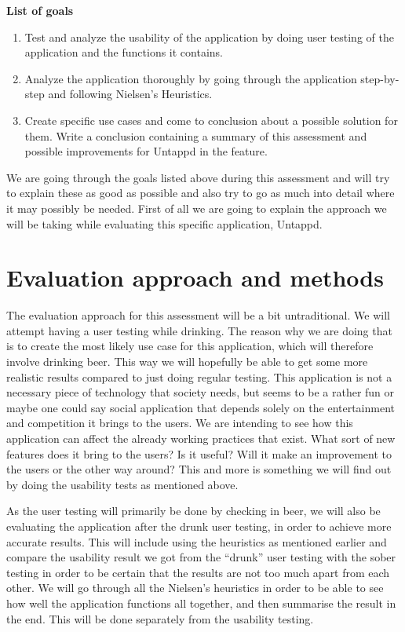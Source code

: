 \documentclass[12pt]{article}
\begin{document}
\textbf{List of goals}
\begin{enumerate}
  \item Test and analyze the usability of the application by doing user testing of the application and the functions it contains.
  \item Analyze the application thoroughly by going through the application step-by-step and following Nielsen’s Heuristics.
  \item Create specific use cases and come to conclusion about a possible solution for them.
  Write a conclusion containing a summary of this assessment and possible improvements for Untappd in the feature.
\end{enumerate}

We are going through the goals listed above during this assessment and will try
to explain these as good as possible and also try to go as much into detail
where it may possibly be needed. First of all we are going to explain the
approach we will be taking while evaluating this specific application, Untappd.


\section{Evaluation approach and methods}

The evaluation approach for this assessment will be a bit untraditional. We will
attempt having a user testing while drinking. The reason why we are doing that
is to create the most likely use case for this application, which will therefore
involve drinking beer. This way we will hopefully be able to get some more
realistic results compared to just doing regular testing. This application is
not a necessary piece of technology that society needs, but seems to be a rather
fun or maybe one could say social application that depends solely on the
entertainment and competition it brings to the users. We are intending to see
how this application can affect the already working practices that exist. What
sort of new features does it bring to the users? Is it useful? Will it make an
improvement to the users or the other way around? This and more is something we
will find out by doing the usability tests as mentioned above.


As the user testing will primarily be done by checking in beer, we will also be
evaluating the application after the drunk user testing, in order to achieve
more accurate results. This will include using the heuristics as mentioned
earlier and compare the usability result we got from the “drunk” user testing
with the sober testing in order to be certain that the results are not too much
apart from each other. We will go through all the Nielsen’s heuristics in order
to be able to see how well the application functions all together, and then
summarise the result in the end. This will be done separately from the usability
testing. 
\end{document}
